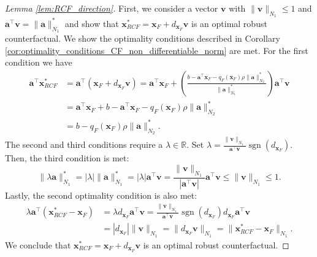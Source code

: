 \documentclass{article}
\DeclareMathOperator*{\sgn}{sgn}
\begin{document}
{\begin{proof}[Lemma \ref{lem:RCF_direction}]
    First, we consider a vector $\bm{v}$ with $\|\bm{v}\|_{N_1}\leq 1$ and $\bm{a}^{\top}\bm{v} = \|\bm{a}\|_{N_1}^*$ and show that $\bm{x}_{RCF}^*=\bm{x}_F+d_{\bm{x}_F}\bm{v}$ is an optimal robust counterfactual. We show the optimality conditions described in Corollary \ref{cor:optimality_conditions_CF_non_differentiable_norm} are met. For the first condition we have
    \begin{align*}
        \bm{a}^\top \bm{x}_{RCF}^* &= \bm{a}^\top (\bm{x}_F+d_{\bm{x}_F}\bm{v})= \bm{a}^\top\bm{x}_F +\left(\frac{b-\bm{a}^{\top}\bm{x}_F- q_F(\bm{x}_F)\rho\|\bm{a}\|_{N_2}^*}{\|\bm{a}\|_{N_1}^*} \right)\bm{a}^\top\bm{v}\\
        &= \bm{a}^\top\bm{x}_F +b-\bm{a}^{\top}\bm{x}_F - q_F(\bm{x}_F)\rho\|\bm{a}\|_{N_2}^*\\
        &=b - q_F(\bm{x}_F)\rho\|\bm{a}\|_{N_2}^*.
    \end{align*}
    The second and third conditions require a $\lambda\in\mathbb{R}$. Set $\lambda=\frac{\|\bm{v}\|_{N_1}}{\bm{a}^{\top}\bm{v}} \sgn(d_{\bm{x}_F})$. Then, the third condition is met:
    $$\|\lambda\bm{a}\|_{N_1}^*=|\lambda| \|\bm{a}\|_{N_1}^*=|\lambda| \bm{a}^{\top}\bm{v}
    = \frac{\|\bm{v}\|_{N_1}}{|\bm{a}^{\top}\bm{v}|} \bm{a}^{\top}\bm{v}\leq \|\bm{v}\|_{N_1}\leq 1.$$
    Lastly, the second optimality condition is also met:
    \begin{align*}
    \lambda \bm{a}^\top (\bm{x}_{RCF}^* - \bm{x}_F) &= \lambda  d_{\bm{x}_F}  \bm{a}^\top \bm{v}
    =\frac{\|\bm{v}\|_{N_1}}{\bm{a}^{\top}\bm{v}} \sgn(d_{\bm{x}_F})   d_{\bm{x}_F}   \bm{a}^\top \bm{v}\\
    &= |d_{\bm{x}_F}|  \|\bm{v}\|_{N_1} =\|d_{\bm{x}_F}  \bm{v}\|_{N_1}=\|\bm{x}_{RCF}^* - \bm{x}_F\|_{N_1} .
    \end{align*}
    We conclude that $\bm{x}_{RCF}^*=\bm{x}_F+d_{\bm{x}_F}\bm{v}$ is an optimal robust counterfactual.


\end{proof}}
\end{document}
